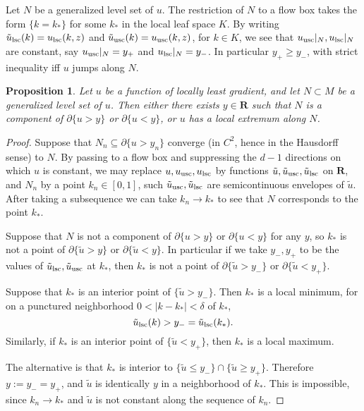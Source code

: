 \documentclass[reqno,11pt]{amsart}
\newcommand{\RR}{\mathbf{R}}
\newtheorem{proposition}[theorem]{Proposition}
\theoremstyle{definition}
\numberwithin{equation}{section}
\begin{document}
Let $N$ be a generalized level set of $u$.
The restriction of $N$ to a flow box takes the form $\{k = k_*\}$ for some $k_*$ in the local leaf space $K$.
By writing $\tilde u_{\rm lsc}(k) = u_{\rm lsc}(k, z)$ and $\tilde u_{\rm usc}(k) = u_{\rm usc}(k, z)$, for $k \in K$, we see that $u_{\rm usc}|_N, u_{\rm lsc}|_N$ are constant, say $u_{\rm usc}|_N = y_+$ and $u_{\rm lsc}|_N = y_-$.
In particular $y_+ \geq y_-$, with strict inequality iff $u$ jumps along $N$.

\begin{proposition}
Let $u$ be a function of locally least gradient, and let $N \subset M$ be a generalized level set of $u$.
Then either there exists $y \in \RR$ such that $N$ is a component of $\partial \{u > y\}$ or $\partial \{u < y\}$, or $u$ has a local extremum along $N$.
\end{proposition}
\begin{proof}
Suppose that $N_n \subseteq \partial \{u > y_n\}$ converge (in $C^2$, hence in the Hausdorff sense) to $N$.
By passing to a flow box and suppressing the $d - 1$ directions on which $u$ is constant, we may replace $u, u_{\rm usc}, u_{\rm lsc}$ by functions $\tilde u, \tilde u_{\rm usc}, \tilde u_{\rm lsc}$ on $\RR$, and $N_n$ by a point $k_n \in [0, 1]$, such $\tilde u_{\rm usc}, \tilde u_{\rm lsc}$ are semicontinuous envelopes of $\tilde u$.
After taking a subsequence we can take $k_n \to k_*$ to see that $N$ corresponds to the point $k_*$.

Suppose that $N$ is not a component of $\partial \{u > y\}$ or $\partial \{u < y\}$ for any $y$, so $k_*$ is not a point of $\partial \{\tilde u > y\}$ or $\partial \{\tilde u < y\}$.
In particular if we take $y_-, y_+$ to be the values of $\tilde u_{\rm lsc}, \tilde u_{\rm usc}$ at $k_*$, then $k_*$ is not a point of $\partial \{\tilde u > y_-\}$ or $\partial \{\tilde u < y_+\}$.

Suppose that $k_*$ is an interior point of $\{\tilde u > y_-\}$.
Then $k_*$ is a local minimum, for on a punctured neighborhood $0 < |k - k_*| < \delta$ of $k_*$,
$$\tilde u_{\rm lsc}(k) > y_- = \tilde u_{\rm lsc}(k_*).$$
Similarly, if $k_*$ is an interior point of $\{\tilde u < y_+\}$, then $k_*$ is a local maximum.

The alternative is that $k_*$ is interior to $\{\tilde u \leq y_-\} \cap \{\tilde u \geq y_+\}$.
Therefore $y := y_- = y_+$, and $\tilde u$ is identically $y$ in a neighborhood of $k_*$.
This is impossible, since $k_n \to k_*$ and $\tilde u$ is not constant along the sequence of $k_n$.
\end{proof}
\end{document}
